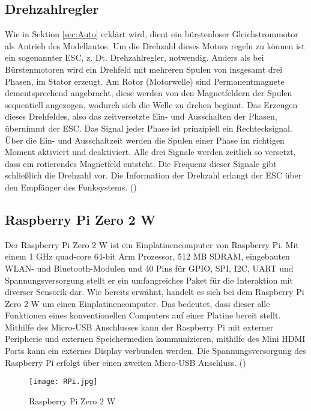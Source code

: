 \subsection{Drehzahlregler}
\label{subsec:tESC}
Wie in Sektion \ref{sec:Auto} erklärt wird, dient ein bürstenloser Gleichstrommotor als Antrieb des Modellautos. Um die Drehzahl dieses Motors regeln zu können ist ein sogenannter \ac{ESC}, z. Dt. Drehzahlregler, notwendig. Anders als bei Bürstenmotoren wird ein Drehfeld mit mehreren Spulen von insgesamt drei Phasen, im Stator erzeugt. Am Rotor (Motorwelle) sind Permanentmagnete dementsprechend angebracht, diese werden von den Magnetfeldern der Spulen sequentiell angezogen, wodurch sich die Welle zu drehen beginnt. Das Erzeugen dieses Drehfeldes, also das zeitversetzte Ein- und Ausschalten der Phasen, übernimmt der \ac{ESC}. Das Signal jeder Phase ist prinzipiell ein Rechtecksignal. Über die Ein- und Ausschaltzeit werden die Spulen einer Phase im richtigen Moment aktiviert und deaktiviert. Alle drei Signale werden zeitlich so versetzt, dass ein rotierendes Magnetfeld entsteht. Die Frequenz dieser Signale gibt schließlich die Drehzahl vor. Die Information der Drehzahl erlangt der \ac{ESC} über den Empfänger des Funksystems.
(\cite{ESC})

\subsection{Raspberry Pi Zero 2 W}
\label{subsec:tRasPi}
Der Raspberry Pi Zero 2 W ist ein Einplatinencomputer von Raspberry Pi. Mit einem 1 \ac{GHz} quad-core 64-bit Arm Prozessor, 512 \ac{MB} \ac{SDRAM}, eingebauten \ac{WLAN}- und Bluetooth-Modulen und 40 Pins für \ac{GPIO}, \ac{SPI}, \ac{I2C}, \ac{UART} und Spannungsversorgung stellt er ein umfangreiches Paket für die Interaktion mit diverser Sensorik dar. Wie bereits erwähnt, handelt es sich bei dem Raspberry Pi Zero 2 W um einen Einplatinencomputer. Das bedeutet, dass dieser alle Funktionen eines konventionellen Computers auf einer Platine bereit stellt. Mithilfe des Micro-\ac{USB} Anschlusses kann der Raspberry Pi mit externer Peripherie und externen Speichermedien kommunizieren, mithilfe des Mini \ac{HDMI} Ports kann ein externes Display verbunden werden. Die Spannungsversorgung des Raspberry Pi erfolgt über einen zweiten Micro-\ac{USB} Anschluss.
(\cite{Raspi})
\begin{figure}[h]
\centering
\texttt{[image: RPi.jpg]}
\caption{Raspberry Pi Zero 2 W}
\label{fig:RaspberryPiZero2W}
\end{figure}

